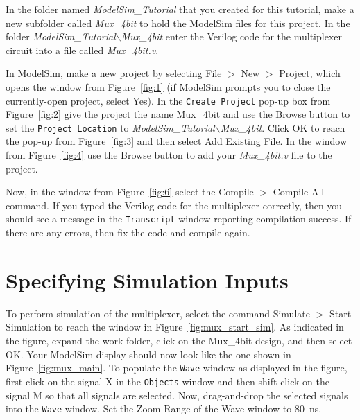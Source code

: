 \documentclass[11pt, twoside, pdftex]{article}
\begin{document}
In the folder named {\it ModelSim\_Tutorial} that you created for this tutorial, make a new
subfolder called {\it Mux\_4bit} to hold the ModelSim files for this project.
In the folder {\it ModelSim\_Tutorial$\backslash$Mux\_4bit} enter the Verilog code for 
the multiplexer circuit into a file called {\it Mux\_4bit.v}.

In ModelSim, make a new project by selecting {\sf File $>$ New $>$ Project}, which opens the window 
from Figure~\ref{fig:1} (if ModelSim prompts you to close the currently-open project, 
select {\sf Yes}).  In the \texttt{Create Project} pop-up box from Figure~\ref{fig:2} give 
the project the name {\sf Mux\_4bit} and use the {\sf Browse} button to set the 
\texttt{Project Location} to {\it ModelSim\_Tutorial$\backslash$Mux\_4bit}. 
Click {\sf OK} to reach the pop-up from Figure~\ref{fig:3} and then select 
{\sf Add Existing File}. In the window from Figure~\ref{fig:4} use the {\sf Browse} button 
to add your {\it Mux\_4bit.v} file to the project. 

Now, in the window from Figure~\ref{fig:6} select the {\sf Compile $>$ Compile All} command.
If you typed the Verilog code for the multiplexer correctly, then you should see a message in the
\texttt{Transcript} window reporting compilation success. If there are any errors, then fix 
the code and compile again.

\section{Specifying Simulation Inputs}

To perform simulation of the multiplexer, select the command {\sf Simulate $>$ Start Simulation}
to reach the window in Figure~\ref{fig:mux_start_sim}. As indicated in the figure, expand the 
{\sf work} folder, click on the {\sf Mux\_4bit} design, and then select {\sf OK}. Your ModelSim
display should now look like the one shown in Figure~\ref{fig:mux_main}. To populate the 
\texttt{Wave} window as displayed in the figure, first click on the signal {\sf X} in the 
\texttt{Objects} window and then shift-click on the signal {\sf M} so that all signals are selected.
Now, drag-and-drop the selected signals into the \texttt{Wave} window. Set the {\sf Zoom Range} 
of the Wave window to 80~ns.
~\\
\end{document}
